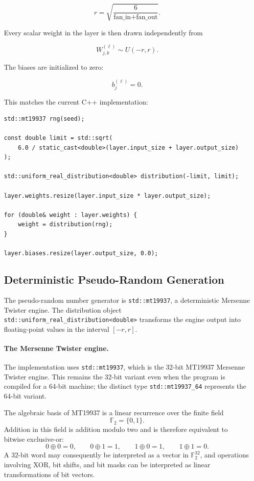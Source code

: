 \documentclass{article}
\begin{document}
\[
  r
  =
  \sqrt{
    \frac{6}
    {\text{fan\_in} + \text{fan\_out}}
  }.
\]

Every scalar weight in the layer is then drawn independently from

\[
  W_{j,k}^{(\ell)}
  \sim
  U(-r,r).
\]

The biases are initialized to zero:

\[
  b_j^{(\ell)} = 0.
\]

This matches the current C++ implementation:

\begin{verbatim}
std::mt19937 rng(seed);

const double limit = std::sqrt(
    6.0 / static_cast<double>(layer.input_size + layer.output_size)
);

std::uniform_real_distribution<double> distribution(-limit, limit);

layer.weights.resize(layer.input_size * layer.output_size);

for (double& weight : layer.weights) {
    weight = distribution(rng);
}

layer.biases.resize(layer.output_size, 0.0);
\end{verbatim}

\subsection{Deterministic Pseudo-Random Generation}

The pseudo-random number generator is \texttt{std::mt19937}, a
deterministic Mersenne Twister engine. The distribution object
\texttt{std::uniform\_real\_distribution<double>} transforms the engine
output into floating-point values in the interval $[-r,r]$.

\paragraph{The Mersenne Twister engine.}

The implementation uses
\texttt{std::mt19937}, which is the 32-bit MT19937 Mersenne Twister
engine. This remains the 32-bit variant even when the program is
compiled for a 64-bit machine; the distinct type
\texttt{std::mt19937\_64} represents the 64-bit variant.

The algebraic basis of MT19937 is a linear recurrence over the finite
field
\[
\mathbb{F}_2=\{0,1\}.
\]
Addition in this field is addition modulo two and is therefore
equivalent to bitwise exclusive-or:
\[
0\oplus0=0,\qquad
0\oplus1=1,\qquad
1\oplus0=1,\qquad
1\oplus1=0.
\]
A \(32\)-bit word may consequently be interpreted as a vector in
\(\mathbb{F}_2^{32}\), and operations involving XOR, bit shifts, and
bit masks can be interpreted as linear transformations of bit vectors.
\end{document}
